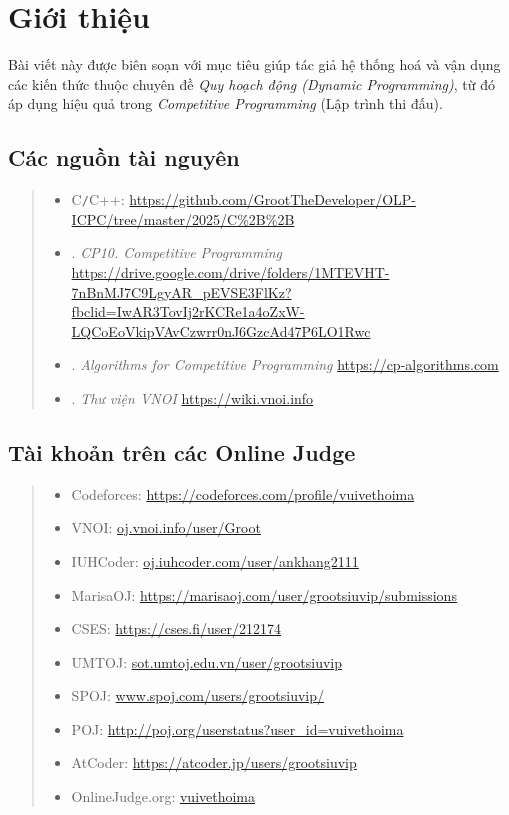\chapter{Giới thiệu}
\minitoc 

Bài viết này được biên soạn với mục tiêu giúp tác giả hệ thống hoá và vận dụng các kiến thức thuộc chuyên đề \textit{Quy hoạch động (Dynamic Programming)}, từ đó áp dụng hiệu quả trong \textit{Competitive Programming} (Lập trình thi đấu).

\section{Các nguồn tài nguyên}
\begin{quote}
    \begin{itemize}
        \item C{\tt/}C++: \url{https://github.com/GrootTheDeveloper/OLP-ICPC/tree/master/2025/C%2B%2B}
        \item \cite{CP10}. \textit{CP10. Competitive Programming} \url{https://drive.google.com/drive/folders/1MTEVHT-7nBnMJ7C9LgyAR_pEVSE3FlKz?fbclid=IwAR3TovIj2rKCRe1a4oZxW-LQCoEoVkipVAvCzwrr0nJ6GzcAd47P6LO1Rwc}
	
        \item \cite{cp-algorithms}. \textit{Algorithms for Competitive Programming} \url{https://cp-algorithms.com}

        \item \cite{VNOI-WIKI}. \textit{Thư viện VNOI} \url{https://wiki.vnoi.info}
    \end{itemize}
\end{quote}

\section{Tài khoản trên các Online Judge}
\begin{quote}
    \begin{itemize}
        \item Codeforces: \url{https://codeforces.com/profile/vuivethoima}
        \item VNOI: \url{oj.vnoi.info/user/Groot}
        \item IUHCoder: \url{oj.iuhcoder.com/user/ankhang2111}
        \item MarisaOJ: \url{https://marisaoj.com/user/grootsiuvip/submissions}
        \item CSES: \url{https://cses.fi/user/212174}
        \item UMTOJ: \url{sot.umtoj.edu.vn/user/grootsiuvip}
        \item SPOJ: \url{www.spoj.com/users/grootsiuvip/}
        \item POJ: \url{http://poj.org/userstatus?user_id=vuivethoima}
        \item AtCoder: \url{https://atcoder.jp/users/grootsiuvip}
        \item OnlineJudge.org: \url{vuivethoima}
    \end{itemize}
\end{quote}

